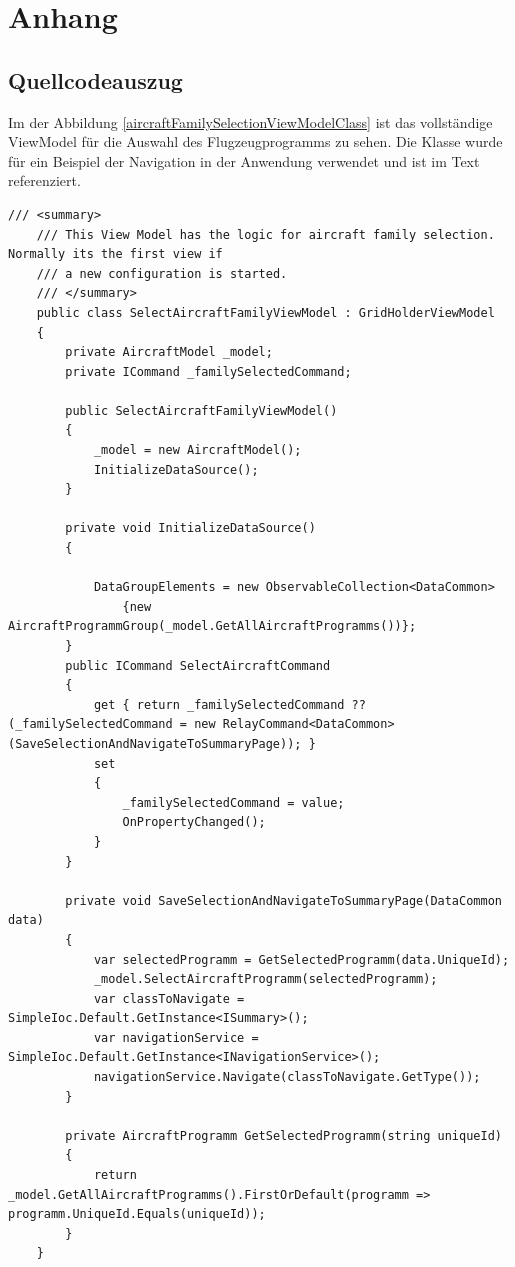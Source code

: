 \chapter{Anhang}


\section{Quellcodeauszug}
Im der Abbildung \ref{aircraftFamilySelectionViewModelClass} ist das vollständige ViewModel für die Auswahl des Flugzeugprogramms zu sehen. Die Klasse wurde für ein Beispiel der Navigation in der Anwendung verwendet und ist im Text referenziert.

\begin{lstlisting}[caption=Vollständige SelectAircraftFamilyViewModel Klasse für die Flugzeugprogrammauswahl]
/// <summary>
    /// This View Model has the logic for aircraft family selection. Normally its the first view if
    /// a new configuration is started.
    /// </summary>
    public class SelectAircraftFamilyViewModel : GridHolderViewModel
    {
        private AircraftModel _model;
        private ICommand _familySelectedCommand;

        public SelectAircraftFamilyViewModel()
        {
            _model = new AircraftModel();
            InitializeDataSource();
        }

        private void InitializeDataSource()
        {

            DataGroupElements = new ObservableCollection<DataCommon>
                {new AircraftProgrammGroup(_model.GetAllAircraftProgramms())}; 
        }
        public ICommand SelectAircraftCommand
        {
            get { return _familySelectedCommand ?? (_familySelectedCommand = new RelayCommand<DataCommon>(SaveSelectionAndNavigateToSummaryPage)); }
            set
            {
                _familySelectedCommand = value;
                OnPropertyChanged();
            }
        }

        private void SaveSelectionAndNavigateToSummaryPage(DataCommon data)
        {
            var selectedProgramm = GetSelectedProgramm(data.UniqueId);
            _model.SelectAircraftProgramm(selectedProgramm);
            var classToNavigate = SimpleIoc.Default.GetInstance<ISummary>();
            var navigationService = SimpleIoc.Default.GetInstance<INavigationService>();
            navigationService.Navigate(classToNavigate.GetType());
        }

        private AircraftProgramm GetSelectedProgramm(string uniqueId)
        {
            return _model.GetAllAircraftProgramms().FirstOrDefault(programm => programm.UniqueId.Equals(uniqueId));
        }
    }
\end{lstlisting} 
\label{aircraftFamilySelectionViewModelClass}

